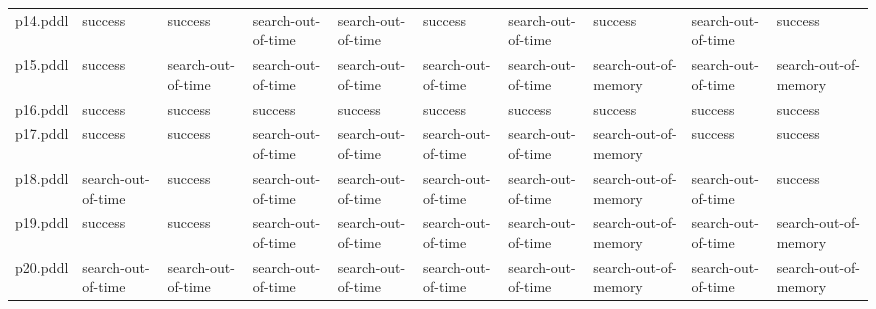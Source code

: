 \documentclass{article}
\begin{document}
\begin{tabular}{@{}lrrrrrrrrr@{}}
p14.pddl & \multicolumn{1}{|l|}{success} & \multicolumn{1}{|l|}{success} & \multicolumn{1}{|l|}{search-out-of-time} & \multicolumn{1}{|l|}{search-out-of-time} & \multicolumn{1}{|l|}{success} & \multicolumn{1}{|l|}{search-out-of-time} & \multicolumn{1}{|l|}{success} & \multicolumn{1}{|l|}{search-out-of-time} & \multicolumn{1}{|l|}{success} \\
p15.pddl & \multicolumn{1}{|l|}{success} & \multicolumn{1}{|l|}{search-out-of-time} & \multicolumn{1}{|l|}{search-out-of-time} & \multicolumn{1}{|l|}{search-out-of-time} & \multicolumn{1}{|l|}{search-out-of-time} & \multicolumn{1}{|l|}{search-out-of-time} & \multicolumn{1}{|l|}{search-out-of-memory} & \multicolumn{1}{|l|}{search-out-of-time} & \multicolumn{1}{|l|}{search-out-of-memory} \\
p16.pddl & \multicolumn{1}{|l|}{success} & \multicolumn{1}{|l|}{success} & \multicolumn{1}{|l|}{success} & \multicolumn{1}{|l|}{success} & \multicolumn{1}{|l|}{success} & \multicolumn{1}{|l|}{success} & \multicolumn{1}{|l|}{success} & \multicolumn{1}{|l|}{success} & \multicolumn{1}{|l|}{success} \\
p17.pddl & \multicolumn{1}{|l|}{success} & \multicolumn{1}{|l|}{success} & \multicolumn{1}{|l|}{search-out-of-time} & \multicolumn{1}{|l|}{search-out-of-time} & \multicolumn{1}{|l|}{search-out-of-time} & \multicolumn{1}{|l|}{search-out-of-time} & \multicolumn{1}{|l|}{search-out-of-memory} & \multicolumn{1}{|l|}{success} & \multicolumn{1}{|l|}{success} \\
p18.pddl & \multicolumn{1}{|l|}{search-out-of-time} & \multicolumn{1}{|l|}{success} & \multicolumn{1}{|l|}{search-out-of-time} & \multicolumn{1}{|l|}{search-out-of-time} & \multicolumn{1}{|l|}{search-out-of-time} & \multicolumn{1}{|l|}{search-out-of-time} & \multicolumn{1}{|l|}{search-out-of-memory} & \multicolumn{1}{|l|}{search-out-of-time} & \multicolumn{1}{|l|}{success} \\
p19.pddl & \multicolumn{1}{|l|}{success} & \multicolumn{1}{|l|}{success} & \multicolumn{1}{|l|}{search-out-of-time} & \multicolumn{1}{|l|}{search-out-of-time} & \multicolumn{1}{|l|}{search-out-of-time} & \multicolumn{1}{|l|}{search-out-of-time} & \multicolumn{1}{|l|}{search-out-of-memory} & \multicolumn{1}{|l|}{search-out-of-time} & \multicolumn{1}{|l|}{search-out-of-memory} \\
p20.pddl & \multicolumn{1}{|l|}{search-out-of-time} & \multicolumn{1}{|l|}{search-out-of-time} & \multicolumn{1}{|l|}{search-out-of-time} & \multicolumn{1}{|l|}{search-out-of-time} & \multicolumn{1}{|l|}{search-out-of-time} & \multicolumn{1}{|l|}{search-out-of-time} & \multicolumn{1}{|l|}{search-out-of-memory} & \multicolumn{1}{|l|}{search-out-of-time} & \multicolumn{1}{|l|}{search-out-of-memory} \\
\end{tabular}
\end{document}

